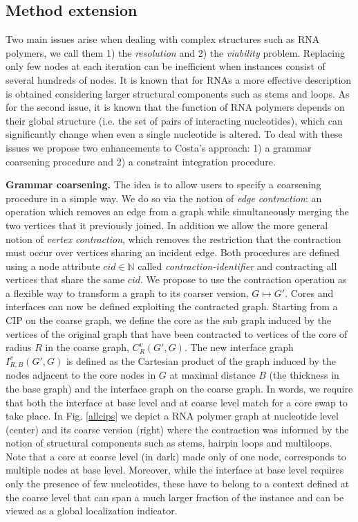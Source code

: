 \documentclass{article}
\newcommand*{\IN}[0]{\ensuremath{\mathbb{N}}}
\begin{document}
\subsection{Method extension}

Two main issues arise when dealing with complex structures such as RNA
polymers, we call them 1) the {\em resolution} and 2) the {\em viability}
problem. Replacing only few nodes at
each iteration can be inefficient when instances consist of several hundreds
of nodes. It is known that for RNAs a more effective description is obtained
considering larger structural components such as stems  and loops. As for the
second issue, it is known that the function of RNA polymers depends on their
global structure (i.e. the set of pairs of interacting nucleotides), which can
significantly change when even a single nucleotide is altered. To deal with
these issues we propose two enhancements to Costa's approach: 1) a
grammar coarsening procedure and 2) a constraint integration procedure.


\textbf{Grammar coarsening.} The idea is to allow users to specify 
a coarsening procedure in a simple way. We do so via the notion of {\em edge
contraction}:
an operation which removes an edge from a graph while simultaneously merging
the two vertices that it previously joined. In addition we allow the more
general notion of {\em vertex contraction}, which removes the restriction that
the contraction must occur over vertices sharing an incident edge. Both
procedures are defined using a node attribute $cid \in \IN$ called {\em
contraction-identifier} and contracting all vertices that share the same $cid$. We propose to use the contraction operation as a flexible way to
transform a graph to its coarser version, $G \mapsto G'$. Cores and interfaces
can now be defined exploiting the contracted graph. Starting from a CIP on the
coarse graph, we define the core as the sub graph induced by the vertices of
the original graph that have been contracted to vertices of the core of radius
$R$ in the coarse graph, $C_R^v(G',G)$.  The new interface graph
$I_{R,B}^v(G',G)$ is defined as the Cartesian product of the graph induced by
the nodes adjacent to the core nodes in $G$ at maximal distance $B$ (the
thickness in the base graph) and the interface graph on the coarse graph. In
words, we require that both the interface at base level and at coarse level
match for a core swap to take place. In Fig. \ref{allcips}  we depict a RNA
polymer graph at nucleotide level (center) and its coarse version (right)
where the contraction was informed by the notion of structural components such
as stems, hairpin loops and multiloops. Note that a core at coarse
level (in dark) made only of one node, corresponds to multiple nodes at
base level. Moreover, while the interface at base level requires only the
presence of few nucleotides, these have to belong to a context defined at the
coarse level that can span a much larger fraction of the instance and can be
viewed as a global localization indicator.
\end{document}
